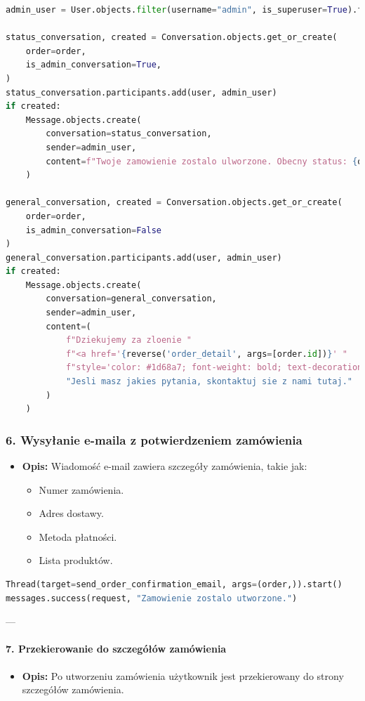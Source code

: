 \documentclass[12pt,a4paper,oneside]{article}
\theoremstyle{definition}
\numberwithin{equation}{section}
\begin{document}
\begin{lstlisting}[language=Python]
admin_user = User.objects.filter(username="admin", is_superuser=True).first()

status_conversation, created = Conversation.objects.get_or_create(
    order=order,
    is_admin_conversation=True,
)
status_conversation.participants.add(user, admin_user)
if created:
    Message.objects.create(
        conversation=status_conversation,
        sender=admin_user,
        content=f"Twoje zamowienie zostalo ulworzone. Obecny status: {order.get_status_display()}."
    )

general_conversation, created = Conversation.objects.get_or_create(
    order=order,
    is_admin_conversation=False
)
general_conversation.participants.add(user, admin_user)
if created:
    Message.objects.create(
        conversation=general_conversation,
        sender=admin_user,
        content=(
            f"Dziekujemy za zloenie "
            f"<a href='{reverse('order_detail', args=[order.id])}' "
            f"style='color: #1d68a7; font-weight: bold; text-decoration: underline;'>zamowienia #{order.id}</a>! "
            "Jesli masz jakies pytania, skontaktuj sie z nami tutaj."
        )
    )
\end{lstlisting}


\subsubsection*{6. Wysyłanie e-maila z potwierdzeniem zamówienia}
\begin{itemize}
    \item \textbf{Opis:} Wiadomość e-mail zawiera szczegóły zamówienia, takie jak:
    \begin{itemize}
        \item Numer zamówienia.
        \item Adres dostawy.
        \item Metoda płatności.
        \item Lista produktów.
    \end{itemize}
\end{itemize}

\begin{lstlisting}[language=Python]
Thread(target=send_order_confirmation_email, args=(order,)).start()
messages.success(request, "Zamowienie zostalo utworzone.")
\end{lstlisting}

---

\paragraph{7. Przekierowanie do szczegółów zamówienia}
\begin{itemize}
    \item \textbf{Opis:} Po utworzeniu zamówienia użytkownik jest przekierowany do strony szczegółów zamówienia.
\end{itemize}
\end{document}
